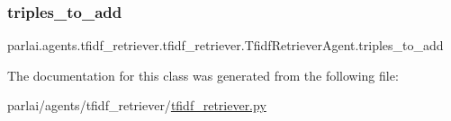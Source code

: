 \subsubsection{\texorpdfstring{triples\+\_\+to\+\_\+add}{triples\_to\_add}}
{\footnotesize\ttfamily parlai.\+agents.\+tfidf\+\_\+retriever.\+tfidf\+\_\+retriever.\+Tfidf\+Retriever\+Agent.\+triples\+\_\+to\+\_\+add}



The documentation for this class was generated from the following file\+:\begin{DoxyCompactItemize}
\item 
parlai/agents/tfidf\+\_\+retriever/\hyperlink{agents_2tfidf__retriever_2tfidf__retriever_8py}{tfidf\+\_\+retriever.\+py}\end{DoxyCompactItemize}
